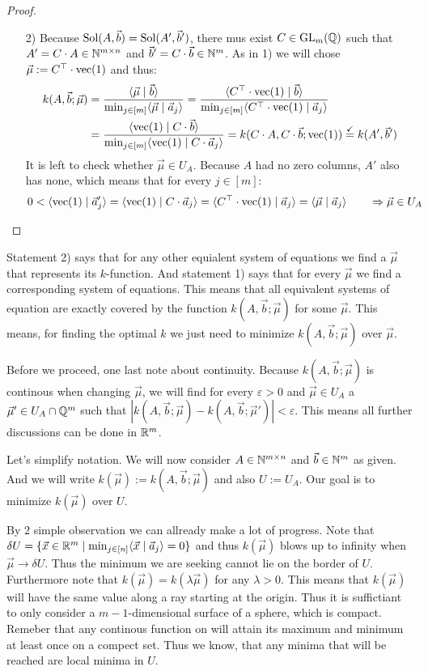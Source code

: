 \begin{proof}
\begin{enumerate}
        \item[2)] Because $\operatorname{Sol}(A, \vec b) = \operatorname{Sol}(A', \vec b')$, there mus exist $C \in \operatorname{GL}_m(\mathbb{Q})$ such that $A' = C \cdot A \in \mathbb{N}^{m \times n}$ and $\vec b' = C \cdot \vec b \in \mathbb{N}^m$. As in 1) we will chose $\vec \mu := C^\top \cdot \operatorname{vec}(1)$ and thus:
        \begin{align*}
            k(A, \vec b; \vec\mu) &= \frac{\langle \vec\mu \mid \vec b \rangle}{\min_{j\in [m]}\langle \vec\mu \mid \vec a_j \rangle} = \frac{\langle C^\top\cdot\operatorname{vec}(1) \mid \vec b \rangle}{\min_{j\in [m]}\langle C^\top\cdot\operatorname{vec}(1) \mid \vec a_j \rangle}\\
            &= \frac{\langle \operatorname{vec}(1) \mid C\cdot\vec b \rangle}{\min_{j\in [m]}\langle \operatorname{vec}(1) \mid C\cdot\vec a_j \rangle} = k(C\cdot A, C\cdot\vec b; \operatorname{vec}(1)) \stackrel{\checkmark}{=} k(A', \vec b')
        \end{align*}
        It is left to check whether $\vec \mu \in U_A$. Because $A$ had no zero columns, $A'$ also has none, which means that for every $j \in [m]$:
        $$0 < \langle \operatorname{vec}(1) \mid \vec a'_j \rangle = \langle \operatorname{vec}(1) \mid C \cdot \vec a_j \rangle = \langle C^\top \cdot \operatorname{vec}(1) \mid \vec a_j \rangle = \langle \vec \mu \mid \vec a_j \rangle \qquad \Rightarrow\vec \mu \in U_A$$

    \end{enumerate}
\end{proof}

Statement 2) says that for any other equialent system of equations we find a $\vec \mu$ that represents its $k$-function. And statement 1) says that for every $\vec \mu$ we find a corresponding system of equations. This means that all equivalent systems of equation are exactly covered by the function $k(A, \vec b; \vec\mu)$ for some $\vec \mu$. This means, for finding the optimal $k$ we just need to minimize $k(A, \vec b; \vec \mu)$ over $\vec \mu$.

Before we proceed, one last note about continuity. Because $k(A, \vec b; \vec \mu)$ is continous when changing $\vec\mu$, we will find for every $\varepsilon > 0$ and $\vec\mu \in U_A$ a $\vec\mu' \in U_A \cap \mathbb{Q}^m$ such that $|k(A, \vec b; \vec \mu) - k(A, \vec b; \vec \mu')| < \varepsilon$. This means all further discussions can be done in $\mathbb{R}^m$.

Let's simplify notation. We will now consider $A \in \mathbb{N}^{m \times n}$ and $\vec b \in \mathbb{N}^m$ as given. And we will write $k(\vec \mu) := k(A, \vec b; \vec \mu)$ and also $U := U_A$. Our goal is to minimize $k(\vec \mu)$ over $U$.

By 2 simple observation we can allready make a lot of progress. Note that $\delta U = \{\vec x \in \mathbb{R}^m \mid \min_{j \in [n]}\langle \vec x \mid \vec a_j \rangle = 0\}$ and thus $k(\vec \mu)$ blows up to infinity when $\vec \mu \to \delta U$. Thus the minimum we are seeking cannot lie on the border of $U$. Furthermore note that $k(\vec \mu) = k(\lambda \vec\mu)$ for any $\lambda > 0$. This means that $k(\vec \mu)$ will have the same value along a ray starting at the origin. Thus it is suffictiant to only consider a $m-1$-dimensional surface of a sphere, which is compact. Remeber that any continous function on will attain its maximum and minimum at least once on a compect set. Thus we know, that any minima that will be reached are local minima in $U$.

